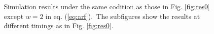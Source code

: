 \documentclass[a4paper,12pt, oneside]{book}
\begin{document}
\begin{figure}[tbp]
 \caption{Simulation results under the same codition as those in Fig. \ref{fig:res0} except $w=2$ in eq. (\ref{eq:arf}).~The subfigures show the results at different timings as in Fig. \ref{fig:res0}.}
 \label{fig:res1}
\end{figure}
\end{document}
